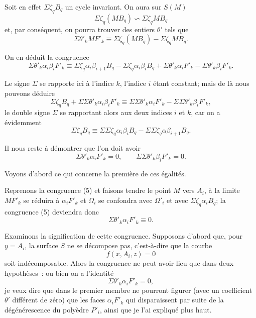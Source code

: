 \documentclass{article}
\begin{document}
Soit en effet $\Sigma \zeta_{q} B_{q}$ un cycle invariant. On aura sur $S(M)$
\[ \Sigma \zeta_{q} (MB_{q}) \backsim \Sigma \zeta_{q} MB_{q} \tag{6} \]
et, par conséquent, on pourra trouver des entiers $\theta'$ tels que
\[ \Sigma \theta'_{k} MF'_{k} \equiv \Sigma \zeta_{q} (MB_{q}) - \Sigma \zeta_{q} MB_{q}. \tag{5} \]

On en déduit la congruence
\[ \Sigma \theta'_{k} \alpha_{i}\beta_{i}F'_{k} \equiv \Sigma \zeta_{q} \alpha_{i}\beta_{i+1}B_{q} - \Sigma \zeta_{q} \alpha_{i}\beta_{i}B_{q} + \Sigma \theta'_{k} \alpha_{i}F'_{k} - \Sigma \theta'_{k} \beta_{i}F'_{k}. \]

Le signe $\Sigma$ se rapporte ici à l'indice $k$, l'indice $i$ étant constant; mais de là nous pouvons déduire
\[ \Sigma \zeta_{q} B_{q} + \Sigma \Sigma \theta'_{k} \alpha_{i}\beta_{i}F'_{k} \equiv \Sigma \Sigma \theta'_{k} \alpha_{i}F'_{k} - \Sigma \Sigma \theta'_{k} \beta_{i}F'_{k}, \]
le double signe $\Sigma$ se rapportant alors aux deux indices $i$ et $k$, car on a évidemment
\[ \Sigma \zeta_{q} B_{q} \equiv \Sigma \Sigma \zeta_{q} \alpha_{i}\beta_{i}B_{q} - \Sigma \Sigma \zeta_{q} \alpha \beta_{i+1}B_{q}. \]


Il nous reste à démontrer que l'on doit avoir
\[ \Sigma \theta'_{k} \alpha_{i}F'_{k} = 0, \qquad \Sigma \Sigma \theta'_{k} \beta_{i}F'_{k} = 0. \]

Voyons d'abord ce qui concerne la première de ces égalités.

Reprenons la congruence (5) et faisons tendre le point $M$ vers $A_{i}$, à la limite $MF'_{k}$ se réduira à $\alpha_{i}F'_{k}$ et $\Omega_{i}$ se confondra avec $\Omega'_{i}$ et avec $\Sigma \zeta_{q} \alpha_{i}B_{q}$; la congruence (5) deviendra donc
\[ \Sigma \theta'_{k} \alpha_{i}F'_{k} \equiv 0. \tag{7} \]

Examinons la signification de cette congruence. Supposons d'abord que, pour $y = A_{i}$, la surface $S$ ne se décompose pas, c'est-à-dire que la courbe
\[ f(x, A_{i}, z) = 0 \]
soit indécomposable. Alors la congruence ne peut avoir lieu que dans deux hypothèses~: ou bien on a l'identité
\[ \Sigma \theta'_{k} \alpha_{i}F'_{k} = 0, \]
je veux dire que dans le premier membre ne pourront figurer (avec un coefficient $\theta'$ différent de zéro) que les faces $\alpha_{i}F'_{k}$ qui disparaissent par suite de la dégénérescence du polyèdre $P'_{i}$, ainsi que je l'ai expliqué plus haut.
\end{document}
